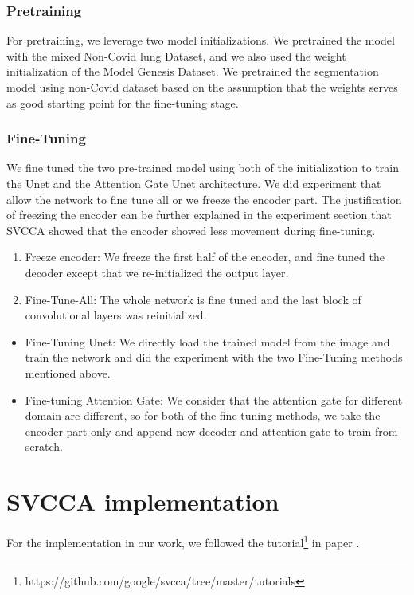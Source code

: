 \subsubsection{Pretraining}
For pretraining, we leverage two model initializations. We pretrained the model with the mixed Non-Covid lung Dataset, and we also used the weight initialization of the Model Genesis Dataset.
We pretrained the segmentation model using non-Covid dataset based on the assumption that the weights serves as good starting point for the fine-tuning stage.
	
\subsubsection{Fine-Tuning}
We fine tuned the two pre-trained model using both of the initialization to train the Unet and the Attention Gate Unet architecture. We did experiment that allow the network to fine tune all or we freeze the encoder part. The justification of freezing the encoder can be further explained in the experiment section that SVCCA showed that the encoder showed less movement during fine-tuning.

\begin{enumerate}
	\item Freeze encoder: We freeze the first half of the encoder, and fine tuned the decoder except that we re-initialized the output layer.
	\item Fine-Tune-All: The whole network is fine tuned and the last block of convolutional layers was reinitialized.
\end{enumerate}

\begin{itemize}
	\item Fine-Tuning Unet: We directly load the trained model from the image and train the network and did the experiment with the two Fine-Tuning methods mentioned above.
	\item Fine-tuning Attention Gate: We consider that the attention gate for different domain are different, so for both of the fine-tuning methods, we take the encoder part only and append new decoder and attention gate to train from scratch.
\end{itemize}


\section{SVCCA implementation}
For the implementation in our work, we followed the tutorial\footnote{https://github.com/google/svcca/tree/master/tutorials} in paper \cite{raghu_svcca_2017}.\\

